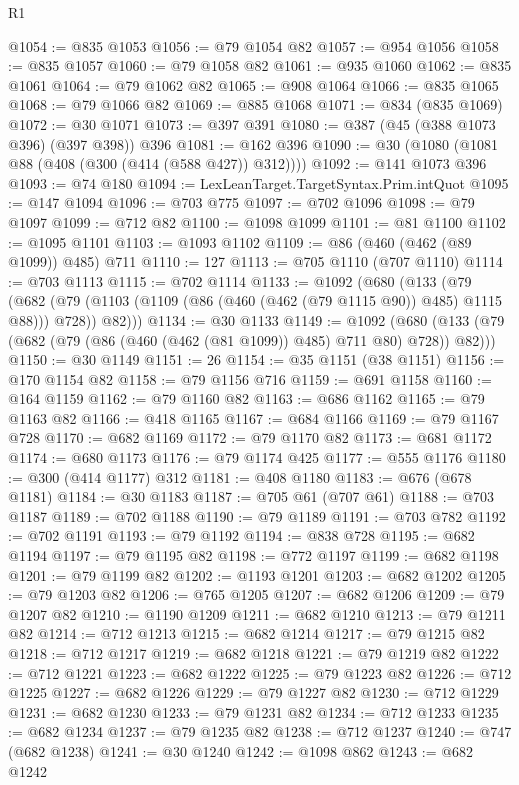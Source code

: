 \begin{lexlean}{R1}
\begin{coremodule}
{{{{{{{{{{{{{{{{{{{{{{{{{{{{{{{{{{{{{{{{{{{{{{{{{{@1054 := @835 @1053
@1056 := @79 @1054 @82
@1057 := @954 @1056
@1058 := @835 @1057
@1060 := @79 @1058 @82
@1061 := @935 @1060
@1062 := @835 @1061
@1064 := @79 @1062 @82
@1065 := @908 @1064
@1066 := @835 @1065
@1068 := @79 @1066 @82
@1069 := @885 @1068
@1071 := @834 (@835 @1069)
@1072 := @30 @1071
@1073 := @397 @391
@1080 := @387 (@45 (@388 @1073 @396) (@397 @398)) @396
@1081 := @162 @396
@1090 := @30 (@1080 (@1081 @88 (@408 (@300 (@414 (@588 @427)) @312))))
@1092 := @141 @1073 @396
@1093 := @74 @180
@1094 := LexLeanTarget.TargetSyntax.Prim.intQuot
@1095 := @147 @1094
@1096 := @703 @775
@1097 := @702 @1096
@1098 := @79 @1097
@1099 := @712 @82
@1100 := @1098 @1099
@1101 := @81 @1100
@1102 := @1095 @1101
@1103 := @1093 @1102
@1109 := @86 (@460 (@462 (@89 @1099)) @485) @711
@1110 := 127
@1113 := @705 @1110 (@707 @1110)
@1114 := @703 @1113
@1115 := @702 @1114
@1133 := @1092
    (@680
      (@133
        (@79
          (@682 (@79 (@1103 (@1109 (@86 (@460 (@462 (@79 @1115 @90)) @485) @1115 @88))) @728))
          @82)))
@1134 := @30 @1133
@1149 := @1092
    (@680 (@133 (@79 (@682 (@79 (@86 (@460 (@462 (@81 @1099)) @485) @711 @80) @728)) @82)))
@1150 := @30 @1149
@1151 := 26
@1154 := @35 @1151 (@38 @1151)
@1156 := @170 @1154 @82
@1158 := @79 @1156 @716
@1159 := @691 @1158
@1160 := @164 @1159
@1162 := @79 @1160 @82
@1163 := @686 @1162
@1165 := @79 @1163 @82
@1166 := @418 @1165
@1167 := @684 @1166
@1169 := @79 @1167 @728
@1170 := @682 @1169
@1172 := @79 @1170 @82
@1173 := @681 @1172
@1174 := @680 @1173
@1176 := @79 @1174 @425
@1177 := @555 @1176
@1180 := @300 (@414 @1177) @312
@1181 := @408 @1180
@1183 := @676 (@678 @1181)
@1184 := @30 @1183
@1187 := @705 @61 (@707 @61)
@1188 := @703 @1187
@1189 := @702 @1188
@1190 := @79 @1189
@1191 := @703 @782
@1192 := @702 @1191
@1193 := @79 @1192
@1194 := @838 @728
@1195 := @682 @1194
@1197 := @79 @1195 @82
@1198 := @772 @1197
@1199 := @682 @1198
@1201 := @79 @1199 @82
@1202 := @1193 @1201
@1203 := @682 @1202
@1205 := @79 @1203 @82
@1206 := @765 @1205
@1207 := @682 @1206
@1209 := @79 @1207 @82
@1210 := @1190 @1209
@1211 := @682 @1210
@1213 := @79 @1211 @82
@1214 := @712 @1213
@1215 := @682 @1214
@1217 := @79 @1215 @82
@1218 := @712 @1217
@1219 := @682 @1218
@1221 := @79 @1219 @82
@1222 := @712 @1221
@1223 := @682 @1222
@1225 := @79 @1223 @82
@1226 := @712 @1225
@1227 := @682 @1226
@1229 := @79 @1227 @82
@1230 := @712 @1229
@1231 := @682 @1230
@1233 := @79 @1231 @82
@1234 := @712 @1233
@1235 := @682 @1234
@1237 := @79 @1235 @82
@1238 := @712 @1237
@1240 := @747 (@682 @1238)
@1241 := @30 @1240
@1242 := @1098 @862
@1243 := @682 @1242
}}}}}}}}}}}}}}}}}}}}}}}}}}}}}}}}}}}}}}}}}}}}}}}}}}
\end{coremodule}
\end{lexlean}
